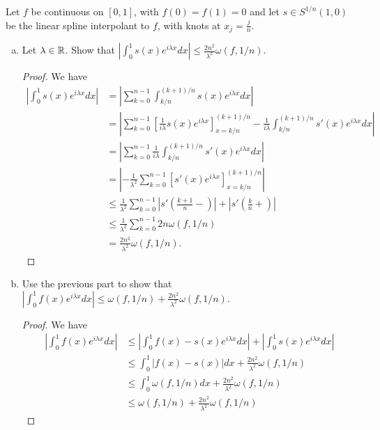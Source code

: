 \documentclass{article}
\begin{document}
 Let $f$ be continuous on $[0,1]$, with $f(0) = f(1) = 0$ and let $s \in S^{1/n}(1,0)$ be the linear spline interpolant to $f$, with knots at $x_j = \frac j n$.
\begin{enumerate}[(a)]
\item Let $\lambda \in \mathbb{R}$. Show that $\left|\int_0^1 s(x) e^{i \lambda x} dx \right| \le \frac{2 n^2}{\lambda^2} \omega(f, 1/n)$.

\begin{proof}
We have
\begin{align*}
\left|\int_0^1 s(x) e^{i \lambda x} dx \right| & = \left| \sum_{k=0}^{n-1} \int_{k/n}^{(k+1)/n}  s(x) e^{i \lambda x} dx \right|
\\ & = \left| \sum_{k=0}^{n-1} \left[\frac{1}{i  \lambda} s(x) e^{i \lambda x} \right]_{x = k/n}^{(k+1)/n} -
\frac{1}{i  \lambda} \int_{k/n}^{(k+1)/n}  s'(x) e^{i \lambda x} dx \right|
\\ & = \left| \sum_{k=0}^{n-1} \frac{1}{i  \lambda} \int_{k/n}^{(k+1)/n}  s'(x) e^{i \lambda x} dx \right|
\\ & = \left| - \frac{1}{\lambda^2} \sum_{k=0}^{n-1}  \left[s'(x) e^{i \lambda x} \right]_{x = k/n}^{(k+1)/n} \right|
\\ & \le \frac{1}{\lambda^2} \sum_{k=0}^{n-1} \left| s' \left(\frac {k+1} n - \right) \right|  + \left| s'\left(\frac {k} n +\right) \right| 
\\ & \le \frac{1}{\lambda^2} \sum_{k=0}^{n-1} 2 n \omega(f, 1/n)
\\ & = \frac{2 n^2}{\lambda^2} \omega(f, 1/n).
\end{align*}
\end{proof}

\item Use the previous part to show that $\left| \int_0^1 f(x) e^{i\lambda x} dx \right| \le \omega(f, 1/n) + \frac{2n^2}{\lambda^2} \omega(f, 1/n)$.

\begin{proof}
We have
\begin{align*}
\left|\int_0^1 f(x) e^{i \lambda x} dx \right| & \le \left|\int_0^1 f(x) - s(x) e^{i \lambda x} dx \right| + \left|\int_0^1 s(x) e^{i \lambda x} dx \right| 
\\ & \le \int_0^1 |f(x) - s(x)| dx +  \frac{2 n^2}{\lambda^2} \omega(f, 1/n)
\\ & \le \int_0^1 \omega(f, 1/n) dx +  \frac{2 n^2}{\lambda^2} \omega(f, 1/n)
\\ & \le \omega(f, 1/n) +  \frac{2 n^2}{\lambda^2} \omega(f, 1/n)
\end{align*}
\end{proof}
\end{enumerate}
\end{document}
